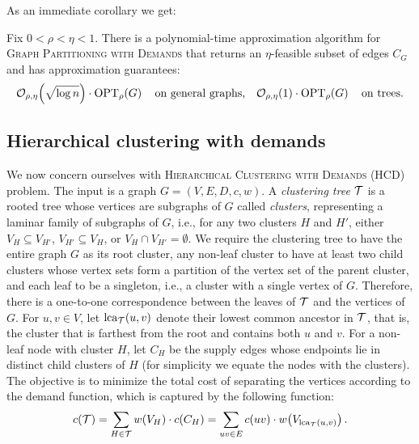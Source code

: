 As an immediate corollary we get:
\begin{corollary}\label{cor:graph-partitioning-approximation}
    Fix $0<\rho<\eta<1$. There is a polynomial-time approximation algorithm for \textsc{Graph Partitioning with Demands} that returns an $\eta$-feasible subset of edges $C_G$ and has approximation guarantees:
    \[
    \mathcal{O}_{\rho,\eta}\mathopen{}\left( \sqrt{\log n} \right)\cdot \textup{OPT}_{\rho}\mathopen{}\left( G \right)
    \quad\text{on general graphs,}\quad
    \mathcal{O}_{\rho,\eta}\mathopen{}\left( 1 \right)\cdot \textup{OPT}_{\rho}\mathopen{}\left( G \right)
    \quad\text{on trees.}
    \]
\end{corollary}

\subsection{Hierarchical clustering with demands}

We now concern ourselves with \textsc{Hierarchical Clustering with Demands} (HCD) problem. The input is a graph $G=(V,E,D,c,w)$. A \emph{clustering tree} $\mathcal{T}$ is a rooted tree whose vertices are subgraphs of $G$ called \emph{clusters}, representing a laminar family of subgraphs of $G$, i.e., for any two clusters $H$ and $H'$, either $V_H\subseteq V_{H'}$, $V_{H'}\subseteq V_H$, or $V_H\cap V_{H'}=\emptyset$. We require the clustering tree to have the entire graph $G$ as its root cluster, any non-leaf cluster to have at least two child clusters whose vertex sets form a partition of the vertex set of the parent cluster, and each leaf to be a singleton, i.e., a cluster with a single vertex of $G$. Therefore, there is a one-to-one correspondence between the leaves of $\mathcal{T}$ and the vertices of $G$.
For $u,v\in V$, let $\operatorname{lca}_{\mathcal{T}}(u,v)$ denote their lowest common ancestor in $\mathcal{T}$, that is, the cluster that is farthest from the root and contains both $u$ and $v$. For a non-leaf node with cluster $H$, let $C_H$ be the supply edges whose endpoints lie in distinct child clusters of $H$ (for simplicity we equate the nodes with the clusters). The objective is to minimize the total cost of separating the vertices according to the demand function, which is captured by the following function:
\begin{equation}\label{eq:Dasgupta}
    c\mathopen{}\left( \mathcal{T} \right)
    =\sum_{H\in\mathcal{T}}
        w\mathopen{}\left( V_H \right)\cdot c\mathopen{}\left( C_H \right)
    =\sum_{uv\in E}c\mathopen{}\left( uv \right)\cdot
        w\mathopen{}\left( V_{\operatorname{lca}_{\mathcal{T}}(u,v)} \right).
\end{equation}

